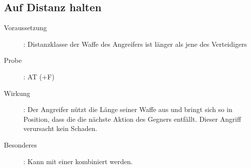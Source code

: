 \subsection{Auf Distanz halten}
\label{aktion.auf_distanz_halten}
\begin{description}
    \item[Voraussetzung]:
        Distanzklasse der Waffe des Angreifers ist länger als jene des Verteidigers
    \item[Probe]:
        AT (+F)
    \item[Wirkung]:
        Der Angreifer nützt die Länge seiner Waffe aus und bringt sich so in Position, dass die die nächste Aktion des Gegners entfällt.
        Dieser Angriff verursacht kein Schaden.
    \item[Besonderes]:
        Kann mit einer  kombiniert werden.
\end{description}
